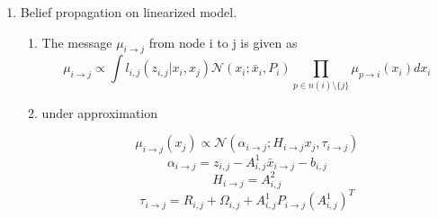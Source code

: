 \documentclass[12pt]{article}
\begin{document}
\begin{enumerate}
\item Belief propagation on linearized model.
\begin{enumerate}

 \item  The message $ \mu_{i \rightarrow j}$ from node i to j is given as
  \begin{equation}
\mu_{i \rightarrow j} \propto \int l_{i,j}(z_{i,j}|x_{i},x_{j})\mathcal{N} (x_{ i };\bar{x}_{ i },P_{i})\prod_{p \in n(i)\setminus \{ j \} } \mu_{p\rightarrow i}(x_{i}) dx_{i}
\end{equation}
\item under approximation

\begin{equation}
   \mu_{i \rightarrow j}(x_{j}) \propto \mathcal{N} (\alpha_{i \rightarrow j};H_{i \rightarrow j}x_{j},\tau_{i \rightarrow j})
\end{equation}
 \begin{equation}
   \alpha_{i \rightarrow j}=z_{i,j}-A^{1}_{i,j}\bar{x}_{i \rightarrow j}-b_{i,j}
\end{equation}
 \begin{equation}
 H_{i \rightarrow j}=A^{2}_{i,j}
\end{equation}
 \begin{equation}
 \tau_{i \rightarrow j}=R_{i,j}+\Omega_{i,j}+A^{1}_{i,j}P_{i \rightarrow j}(A^{1}_{i,j})^{T}
\end{equation}

\end{enumerate}

\end{enumerate}
\pagebreak
\end{document}
